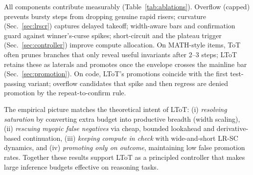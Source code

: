 \documentclass{article}
\begin{document}
All components contribute measurably (Table~\ref{tab:ablations}).
Overflow (capped) prevents bursty steps from dropping genuine rapid risers; curvature (Sec.~\ref{sec:lrscr}) captures delayed takeoff; width-aware bars and confirmation guard against winner's-curse spikes; short-circuit and the plateau trigger (Sec.~\ref{sec:controller}) improve compute allocation. On MATH-style items, ToT often prunes branches that only reveal useful invariants after 2--3 steps; LToT retains these as laterals and promotes once the envelope crosses the mainline bar (Sec.~\ref{sec:promotion}).
On code, LToT's promotions coincide with the first test-passing variant; overflow candidates that spike and then regress are denied promotion by the repeat-to-confirm rule.

The empirical picture matches the theoretical intent of LToT:
(i) \emph{resolving saturation} by converting extra budget into productive breadth (width scaling),
(ii) \emph{rescuing myopic false negatives} via cheap, bounded lookahead and derivative-based continuation,
(iii) \emph{keeping compute in check} with wide-and-short LR-SC dynamics, and
(iv) \emph{promoting only on outcome}, maintaining low false promotion rates.
Together these results support LToT as a principled controller that makes large inference budgets effective on reasoning tasks.

\begin{table}[t]
\centering
\caption{\textbf{Noisy/nonstationary evaluator.} GSM-Plus Success@1 and false-promotion rate (FPR, \%) when exploration uses LM-scored $v_{\text{LM}}$; promotion remains verifier-aligned. \emph{Forecasted} means.}
\vspace{0.3em}
\label{tab:noisy-gsm}
\end{table}
\end{document}

